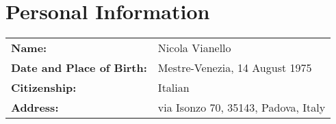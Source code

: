 \section{Personal Information}
\begin{tabular}{ll}
\textbf{Name:} & Nicola Vianello \\
\textbf{Date and Place of Birth:} & Mestre-Venezia, 14 August 1975 \\
\textbf{Citizenship:} & Italian \\
\textbf{Address:} & via Isonzo 70, 35143, Padova, Italy 
\end{tabular}
